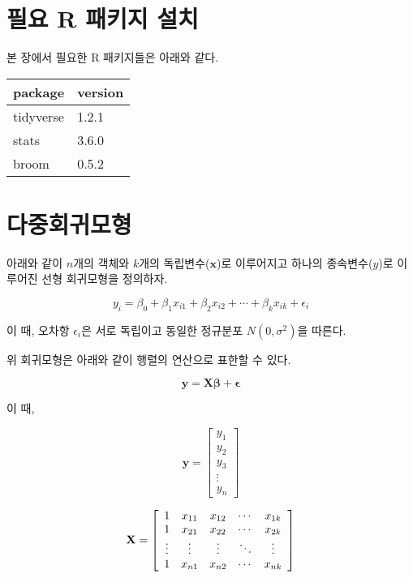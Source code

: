 \documentclass[]{book}
\begin{document}
\hypertarget{regression-packages-install}{%
\section{필요 R 패키지 설치}\label{regression-packages-install}}

본 장에서 필요한 R 패키지들은 아래와 같다.

\begin{tabular}{l|l}
\hline
package & version\\
\hline
tidyverse & 1.2.1\\
\hline
stats & 3.6.0\\
\hline
broom & 0.5.2\\
\hline
\end{tabular}

\hypertarget{multiple-linear-regression}{%
\section{다중회귀모형}\label{multiple-linear-regression}}

아래와 같이 \(n\)개의 객체와 \(k\)개의 독립변수(\(\mathbf{x}\))로 이루어지고 하나의 종속변수(\(y\))로 이루어진 선형 회귀모형을 정의하자.

\begin{equation}
y_i = \beta_0 + \beta_1 x_{i1} + \beta_2 x_{i2} + \cdots + \beta_k x_{ik} + \epsilon_i
\label{eq:multiple-linear-regression}
\end{equation}

이 때, 오차항 \(\epsilon_i\)은 서로 독립이고 동일한 정규분포 \(N(0, \sigma^2)\)을 따른다.

위 회귀모형은 아래와 같이 행렬의 연산으로 표한할 수 있다.

\begin{equation}
\mathbf{y} = \mathbf{X} \boldsymbol{\beta} + \boldsymbol{\epsilon} \label{eq:multiple-linear-regression-matrix}
\end{equation}

이 때,

\[
\mathbf{y} = \left[ \begin{array}{c}
y_1 \\ y_2 \\ y_3 \\ \vdots \\ y_n
\end{array} \right]
\]

\[
\mathbf{X} = \left[ \begin{array}{c c c c c}
1 & x_{11} & x_{12} & \cdots & x_{1k}\\
1 & x_{21} & x_{22} & \cdots & x_{2k}\\
\vdots & \vdots & \vdots & \ddots & \vdots \\
1 & x_{n1} & x_{n2} & \cdots & x_{nk}
\end{array} \right]
\]
\end{document}
